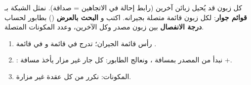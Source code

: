 \begin{statement}
كل زبون قد يُحيل زبائن آخرين (رابط إحالة في الاتجاهين = صداقة). نمثل الشبكة بـ \textbf{قوائم جوار}: لكل زبون قائمة متصلة بجيرانه. اكتب  و \textbf{البحث بالعرض} () بطابور لحساب \textbf{درجة الانفصال} بين زبون مصدر وكل الآخرين، وعدد المكونات المتصلة.
\end{statement}
\begin{stepsbox}\begin{enumerate}
\item {} رأس قائمة الجيران؛  تدرج  في قائمة  و  في قائمة .
\item {}: نبدأ من المصدر بمسافة ، ونعالج الطابور: كل جار غير مزار يأخذ مسافة +.
\item المكونات: نكرر  من كل عقدة غير مزارة.
\end{enumerate}\end{stepsbox}
